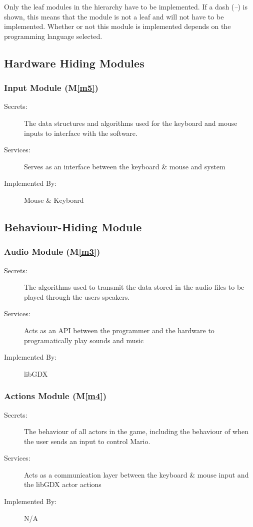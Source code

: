 \documentclass[12pt, titlepage]{article}
\newcommand{\mref}[1]{M\ref{#1}}
\begin{document}
Only the leaf modules in the
hierarchy have to be implemented. If a dash (\emph{--}) is shown, this means
that the module is not a leaf and will not have to be implemented. Whether or
not this module is implemented depends on the programming language
selected.

\subsection{Hardware Hiding Modules}

\subsubsection{Input Module (\mref{m5})}
\begin{description}
\item[Secrets:]The data structures and algorithms used for the keyboard and mouse inputs to interface with the software.
\item[Services:]Serves as an interface between the keyboard \& mouse and system
\item[Implemented By:] Mouse \& Keyboard
\end{description}

\subsection{Behaviour-Hiding Module}

\subsubsection{Audio Module (\mref{m3})}
\begin{description}
\item[Secrets:] The algorithms used to transmit the data stored in the audio files to be played through the users speakers.
\item[Services:] Acts as an API between the programmer and the hardware to programatically play sounds and music
\item[Implemented By:] libGDX
\end{description}

\subsubsection{Actions Module (\mref{m4})}
\begin{description}
\item[Secrets:] The behaviour of all actors in the game, including the behaviour of when the user sends an input to control Mario.
\item[Services:] Acts as a communication layer between the keyboard \& mouse input and the libGDX actor actions
\item[Implemented By:] N/A
\end{description}
\end{document}
